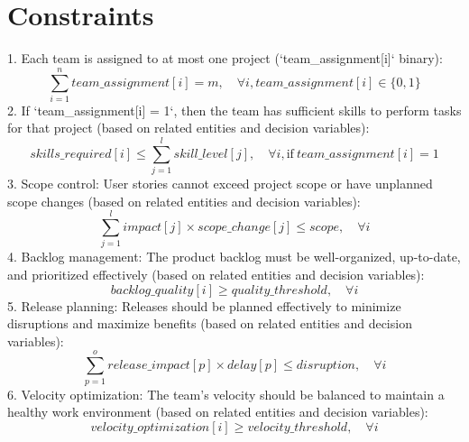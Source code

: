 \documentclass{article}
\begin{document}
\section{Constraints}
1. Each team is assigned to at most one project (`team_assignment[i]` binary):
\[
\sum_{i=1}^{n} team\_assignment[i] = m, \quad \forall i, team\_assignment[i] \in \{0, 1\}
\]
2. If `team_assignment[i] = 1`, then the team has sufficient skills to perform tasks for that project (based on related entities and decision variables):
\[
skills\_required[i] \leq \sum_{j=1}^{l} skill\_level[j], \quad \forall i, \text{{if}} \ team\_assignment[i] = 1
\]
3. Scope control: User stories cannot exceed project scope or have unplanned scope changes (based on related entities and decision variables):
\[
\sum_{j=1}^{l} impact[j] \times scope\_change[j] \leq scope, \quad \forall i
\]
4. Backlog management: The product backlog must be well-organized, up-to-date, and prioritized effectively (based on related entities and decision variables):
\[
backlog\_quality[i] \geq quality\_threshold, \quad \forall i
\]
5. Release planning: Releases should be planned effectively to minimize disruptions and maximize benefits (based on related entities and decision variables):
\[
\sum_{p=1}^{o} release\_impact[p] \times delay[p] \leq disruption, \quad \forall i
\]
6. Velocity optimization: The team's velocity should be balanced to maintain a healthy work environment (based on related entities and decision variables):
\[
velocity\_optimization[i] \geq velocity\_threshold, \quad \forall i
\]
\end{document}
